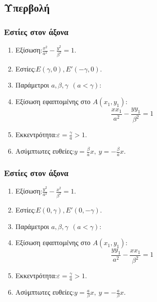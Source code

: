 \documentclass[11pt,a4paper]{article}
\begin{document}
\subsection{Υπερβολή}
\begin{multicols}{2}
\subsubsection{Εστίες στον άξονα }
\begin{enumerate}
\item Εξίσωση:\quad $ \frac{x^2}{a^2}-\frac{y^2}{\beta^2}=1 $.
\item Εστίες:\quad $ E\left(\gamma,0 \right), E'(-\gamma,0) $.
\item Παράμετροι $ a,\beta,\gamma\ \ (a<\gamma) $:
\item Εξίσωση εφαπτομένης στο $ A(x_1,y_1) $: \[  \frac{xx_1}{a^2}-\frac{yy_1}{\beta^2}=1  \]
\item Εκκεντρότητα:\quad $ \varepsilon=\frac{\gamma}{a}>1 $.
\item Ασύμπτωτες ευθείες:\quad $ y=\frac{\beta}{a}x,\ y=-\frac{\beta}{a}x $.
\end{enumerate}
\subsubsection{Εστίες στον άξονα }
\begin{enumerate}
\item Εξίσωση:\quad $ \frac{y^2}{a^2}-\frac{x^2}{\beta^2}=1 $.
\item Εστίες:\quad $ E\left(0,\gamma\right), E'(0,-\gamma) $.
\item Παράμετροι $ a,\beta,\gamma\ \ (a<\gamma) $:
\item Εξίσωση εφαπτομένης στο $ A(x_1,y_1) $: \[  \frac{yy_1}{a^2}-\frac{xx_1}{\beta^2}=1  \]
\item Εκκεντρότητα:\quad $ \varepsilon=\frac{\gamma}{a}>1 $.
\item Ασύμπτωτες ευθείες:\quad $ y=\frac{a}{\beta}x,\ y=-\frac{a}{\beta}x $.
\end{enumerate}
\end{multicols}
\end{document}
